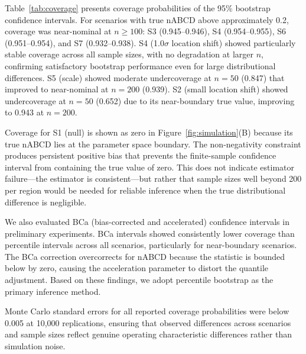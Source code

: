 \documentclass[AMA,Times1COL]{WileyNJDv5}
\begin{document}
Table~\ref{tab:coverage} presents coverage probabilities of the 95\% bootstrap confidence intervals. For scenarios with true nABCD above approximately 0.2, coverage was near-nominal at $n \geq 100$: S3 (0.945--0.946), S4 (0.954--0.955), S6 (0.951--0.954), and S7 (0.932--0.938). S4 (1.0$\sigma$ location shift) showed particularly stable coverage across all sample sizes, with no degradation at larger $n$, confirming satisfactory bootstrap performance even for large distributional differences. S5 (scale) showed moderate undercoverage at $n=50$ (0.847) that improved to near-nominal at $n=200$ (0.939). S2 (small location shift) showed undercoverage at $n=50$ (0.652) due to its near-boundary true value, improving to 0.943 at $n=200$.

Coverage for S1 (null) is shown as zero in Figure~\ref{fig:simulation}(B) because its true nABCD lies at the parameter space boundary. The non-negativity constraint produces persistent positive bias that prevents the finite-sample confidence interval from containing the true value of zero. This does not indicate estimator failure---the estimator is consistent---but rather that sample sizes well beyond 200 per region would be needed for reliable inference when the true distributional difference is negligible.

We also evaluated BCa (bias-corrected and accelerated) confidence intervals in preliminary experiments. BCa intervals showed consistently lower coverage than percentile intervals across all scenarios, particularly for near-boundary scenarios. The BCa correction overcorrects for nABCD because the statistic is bounded below by zero, causing the acceleration parameter to distort the quantile adjustment. Based on these findings, we adopt percentile bootstrap as the primary inference method.

Monte Carlo standard errors for all reported coverage probabilities were below 0.005 at 10{,}000 replications, ensuring that observed differences across scenarios and sample sizes reflect genuine operating characteristic differences rather than simulation noise.
\end{document}
